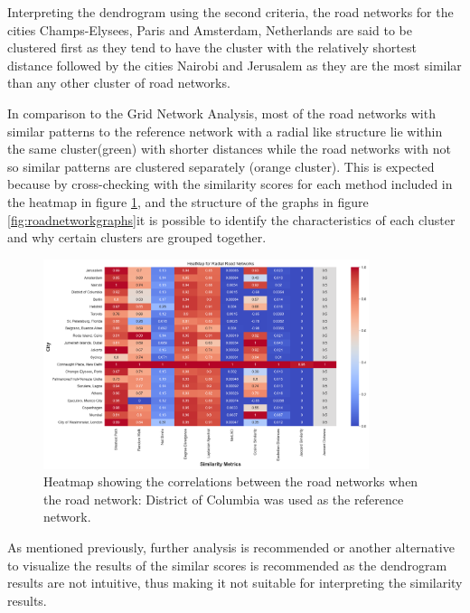 Interpreting the dendrogram using the second criteria, the road networks for the cities Champs-Elysees, Paris and Amsterdam, Netherlands are said to be clustered first as they tend to have the cluster with the relatively shortest distance followed by the cities Nairobi and Jerusalem as they are the most similar than any other cluster of road networks.

In comparison to the Grid Network Analysis, most of the road networks with similar patterns to the reference network with a radial like structure lie within the same cluster(green) with shorter distances while the road networks with not so similar patterns are clustered separately (orange cluster). This is expected because by cross-checking with the similarity scores for each method included in the heatmap in figure \ref{fig:Heatmap showing the correlations for Radial Road Networks}, and the structure of the graphs in figure \ref{fig:roadnetworkgraphs}it is possible to identify the characteristics of each cluster and why certain clusters are grouped together.

\begin{figure}[!ht]
\centering
\includegraphics[width=0.85\textwidth,center]{picture/Radial/radialheatmap.png}
\caption[Heatmap showing the correlations for Radial Road Networks]{Heatmap showing the correlations between the road networks when the road network: District of Columbia was used as the reference network.}
\label{fig:Heatmap showing the correlations for Radial Road Networks}
\end{figure}


As mentioned previously, further analysis is recommended or another alternative to visualize the results of the similar scores is recommended as the dendrogram results are not intuitive, thus making it not suitable for interpreting the similarity results.


